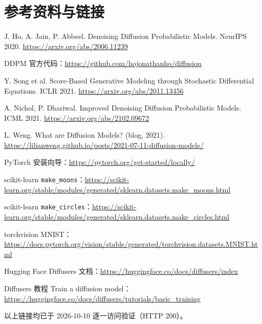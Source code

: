 \documentclass[a4paper,fontset=none,zihao=5]{ctexart}
\newcommand{\code}[1]{\texttt{#1}}
\begin{document}
\section{参考资料与链接}
\small
\begin{enumerate}[label={[\arabic*]},leftmargin=2.2em,itemsep=2pt]
  \item J. Ho, A. Jain, P. Abbeel. Denoising Diffusion Probabilistic Models. NeurIPS 2020. \url{https://arxiv.org/abs/2006.11239}
  \item DDPM 官方代码：\url{https://github.com/hojonathanho/diffusion}
  \item Y. Song et al. Score-Based Generative Modeling through Stochastic Differential Equations. ICLR 2021. \url{https://arxiv.org/abs/2011.13456}
  \item A. Nichol, P. Dhariwal. Improved Denoising Diffusion Probabilistic Models. ICML 2021. \url{https://arxiv.org/abs/2102.09672}
  \item L. Weng. What are Diffusion Models? (blog, 2021). \url{https://lilianweng.github.io/posts/2021-07-11-diffusion-models/}
  \item PyTorch 安装向导：\url{https://pytorch.org/get-started/locally/}
  \item scikit-learn \code{make\_moons}：\url{https://scikit-learn.org/stable/modules/generated/sklearn.datasets.make_moons.html}
  \item scikit-learn \code{make\_circles}：\url{https://scikit-learn.org/stable/modules/generated/sklearn.datasets.make_circles.html}
  \item torchvision MNIST：\url{https://docs.pytorch.org/vision/stable/generated/torchvision.datasets.MNIST.html}
  \item Hugging Face Diffusers 文档：\url{https://huggingface.co/docs/diffusers/index}
  \item Diffusers 教程 Train a diffusion model：\url{https://huggingface.co/docs/diffusers/tutorials/basic_training}
\end{enumerate}
{\footnotesize\color{cmuted} 以上链接均已于 2026-10-10 逐一访问验证（HTTP 200）。}
\end{document}
